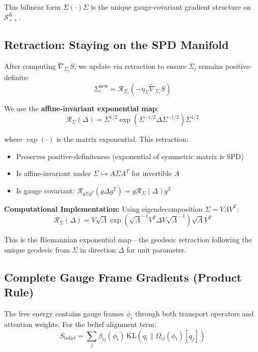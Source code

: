 \documentclass[11pt]{article}
\begin{document}
This bilinear form $\Sigma (\cdot) \Sigma$ is the unique gauge-covariant gradient structure on $\mathcal{S}_{++}^K$.

\subsection*{Retraction: Staying on the SPD Manifold}

After computing $\tilde{\nabla}_{\Sigma_i} S$, we update via retraction to ensure $\Sigma_i$ remains positive-definite:
\begin{equation}
\Sigma_i^{\mathrm{new}} = \mathcal{R}_{\Sigma_i}(-\eta_\Sigma \tilde{\nabla}_{\Sigma_i} S)
\end{equation}

We use the \textbf{affine-invariant exponential map}:
\begin{equation}
\mathcal{R}_{\Sigma}(\Delta) = \Sigma^{1/2} \exp\left(\Sigma^{-1/2} \Delta \Sigma^{-1/2}\right) \Sigma^{1/2}
\end{equation}

where $\exp(\cdot)$ is the matrix exponential. This retraction:
\begin{itemize}
\item Preserves positive-definiteness (exponential of symmetric matrix is SPD)
\item Is affine-invariant under $\Sigma \mapsto A\Sigma A^T$ for invertible $A$
\item Is gauge covariant: $\mathcal{R}_{g\Sigma g^T}(g\Delta g^T) = g \mathcal{R}_{\Sigma}(\Delta) g^T$
\end{itemize}

\textbf{Computational Implementation:} Using eigendecomposition $\Sigma = V\Lambda V^T$:
\begin{equation}
\mathcal{R}_{\Sigma}(\Delta) = V \sqrt{\Lambda} \exp\left(\sqrt{\Lambda}^{-1} V^T \Delta V \sqrt{\Lambda}^{-1}\right) \sqrt{\Lambda} V^T
\end{equation}

This is the Riemannian exponential map---the geodesic retraction following the unique geodesic from $\Sigma$ in direction $\Delta$ for unit parameter.



\subsection*{Complete Gauge Frame Gradients (Product Rule)}

The free energy contains gauge frames $\phi_i$ through both transport operators and attention weights. For the belief alignment term:
\begin{equation}
S_{\mathrm{belief}} = \sum_j \beta_{ij}(\phi_i) \, \mathrm{KL}(q_i \| \Omega_{ij}(\phi_i)[q_j])
\end{equation}
\end{document}
